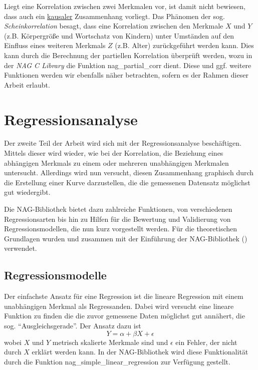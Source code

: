 \documentclass{article}
\begin{document}
Liegt eine Korrelation zwischen zwei Merkmalen vor, ist damit nicht bewiesen, dass auch ein \underline{kausaler} Zusammenhang vorliegt. Das Phänomen der sog. {\it Scheinkorrelation} besagt, dass eine Korrelation zwischen den Merkmale $X$ und $Y$ (z.B. Körpergröße und Wortschatz von Kindern) unter Umständen auf den Einfluss eines weiteren Merkmals $Z$ (z.B. Alter) zurückgeführt werden kann. Dies kann durch die Berechnung der partiellen Korrelation überprüft werden, wozu in der {\it NAG C Library} die Funktion nag\_partial\_corr dient. Diese und ggf. weitere Funktionen werden wir ebenfalls näher betrachten, sofern es der Rahmen dieser Arbeit erlaubt.

\section{Regressionsanalyse}

Der zweite Teil der Arbeit wird sich mit der Regressionsanalyse beschäftigen.
Mittels dieser wird wieder, wie bei der Korrelation, die Beziehung eines abhängigen Merkmals zu einem oder mehreren unabhängigen Merkmalen untersucht.
Allerdings wird nun versucht, diesen Zusammenhang graphisch durch die Erstellung einer Kurve darzustellen, die die gemessenen Datensatz möglichst gut wiedergibt.

Die NAG-Bibliothek bietet dazu zahlreiche Funktionen, von verschiedenen Regressionsarten bis hin zu Hilfen für die Bewertung und Validierung von Regressionsmodellen, die nun kurz vorgestellt werden.
Für die theoretischen Grundlagen wurden \cite{Cramer2007} und \cite{Fahrmeier2010} zusammen mit der Einführung der NAG-Bibliothek (\cite{nag:intro}) verwendet.

\subsection{Regressionsmodelle}

Der einfachste Ansatz für eine Regression ist die lineare Regression mit einem unabhängigen Merkmal als Regressanden.
Dabei wird versucht eine lineare Funktion zu finden die die zuvor gemessene Daten möglichst gut annähert, die sog. "`Ausgleichsgerade"'.
Der Ansatz dazu ist
\begin{equation*}
 Y = \alpha + \beta X +\epsilon
\end{equation*}
wobei $X$ und $Y$ metrisch skalierte Merkmale sind und $\epsilon$ ein Fehler, der nicht durch $X$ erklärt werden kann.
In der NAG-Bibliothek wird diese Funktionalität durch die Funktion nag\_simple\_linear\_regression zur Verfügung gestellt.
\end{document}
